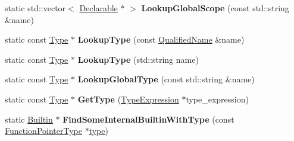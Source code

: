 \begin{DoxyCompactItemize}
\item 
\mbox{\label{classv8_1_1internal_1_1torque_1_1Declarations_aa88ca42beead63073318731fc4655c74}} 
static std\+::vector$<$ \mbox{\hyperlink{classv8_1_1internal_1_1torque_1_1Declarable}{Declarable}} $\ast$ $>$ {\bfseries Lookup\+Global\+Scope} (const std\+::string \&name)
\item 
\mbox{\label{classv8_1_1internal_1_1torque_1_1Declarations_abdf3bc0394a2df98d9f15b3115dd001a}} 
static const \mbox{\hyperlink{classv8_1_1internal_1_1torque_1_1Type}{Type}} $\ast$ {\bfseries Lookup\+Type} (const \mbox{\hyperlink{structv8_1_1internal_1_1torque_1_1QualifiedName}{Qualified\+Name}} \&name)
\item 
\mbox{\label{classv8_1_1internal_1_1torque_1_1Declarations_a7e6216c61ac21da66303e0fabd02c758}} 
static const \mbox{\hyperlink{classv8_1_1internal_1_1torque_1_1Type}{Type}} $\ast$ {\bfseries Lookup\+Type} (std\+::string name)
\item 
\mbox{\label{classv8_1_1internal_1_1torque_1_1Declarations_a2f0ba23dd779116f3948b3f1833ad1a3}} 
static const \mbox{\hyperlink{classv8_1_1internal_1_1torque_1_1Type}{Type}} $\ast$ {\bfseries Lookup\+Global\+Type} (const std\+::string \&name)
\item 
\mbox{\label{classv8_1_1internal_1_1torque_1_1Declarations_ab4e5d97b1213ae13e50648db9f2f2bca}} 
static const \mbox{\hyperlink{classv8_1_1internal_1_1torque_1_1Type}{Type}} $\ast$ {\bfseries Get\+Type} (\mbox{\hyperlink{structv8_1_1internal_1_1torque_1_1TypeExpression}{Type\+Expression}} $\ast$type\+\_\+expression)
\item 
\mbox{\label{classv8_1_1internal_1_1torque_1_1Declarations_a54dbfae48a15fcc469518f1963bfd0d4}} 
static \mbox{\hyperlink{classv8_1_1internal_1_1torque_1_1Builtin}{Builtin}} $\ast$ {\bfseries Find\+Some\+Internal\+Builtin\+With\+Type} (const \mbox{\hyperlink{classv8_1_1internal_1_1torque_1_1FunctionPointerType}{Function\+Pointer\+Type}} $\ast$\mbox{\hyperlink{classstd_1_1conditional_1_1type}{type}})
\item 

\end{DoxyCompactItemize}
